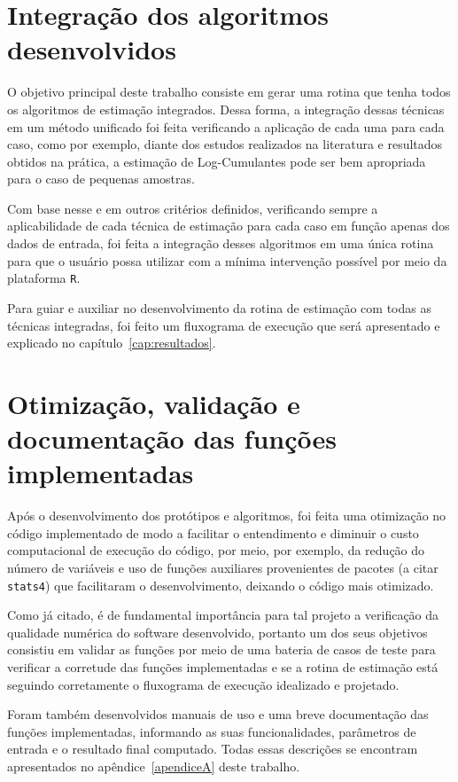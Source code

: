 \section{Integração dos algoritmos desenvolvidos}

O objetivo principal deste trabalho consiste em gerar uma rotina que tenha todos os algoritmos de estimação integrados. Dessa forma, a integração dessas técnicas em um método unificado foi feita verificando a aplicação de cada uma para cada caso, como por exemplo, diante dos estudos realizados na literatura e resultados obtidos na prática, a estimação de Log-Cumulantes pode ser bem apropriada para o caso de pequenas amostras.

Com base nesse e em outros critérios definidos, verificando sempre a aplicabilidade de cada técnica de estimação para cada caso em função apenas dos dados de entrada, foi feita a integração desses algoritmos em uma única rotina para que o usuário possa utilizar com a mínima intervenção possível por meio da plataforma \texttt{R}.

Para guiar e auxiliar no desenvolvimento da rotina de estimação com todas as técnicas integradas, foi feito um fluxograma de execução que será apresentado e explicado no capítulo~\ref{cap:resultados}.


\section{Otimização, validação e documentação das funções implementadas}

Após o desenvolvimento dos protótipos e algoritmos, foi feita uma otimização no código implementado de modo a facilitar o entendimento e diminuir o custo computacional de execução do código, por meio, por exemplo, da redução do número de variáveis e uso de funções auxiliares provenientes de pacotes (a citar \texttt{stats4}) que facilitaram o desenvolvimento, deixando o código mais otimizado.

Como já citado, é de fundamental importância para tal projeto a verificação da qualidade numérica do software desenvolvido, portanto um dos seus objetivos consistiu em validar as funções por meio de uma bateria de casos de teste para verificar a corretude das funções implementadas e se a rotina de estimação está seguindo corretamente o fluxograma de execução idealizado e projetado.

Foram também desenvolvidos manuais de uso e uma breve documentação das funções implementadas, informando as suas funcionalidades, parâmetros de entrada e o resultado final computado. Todas essas descrições se encontram apresentados no apêndice~\ref{apendiceA} deste trabalho.
